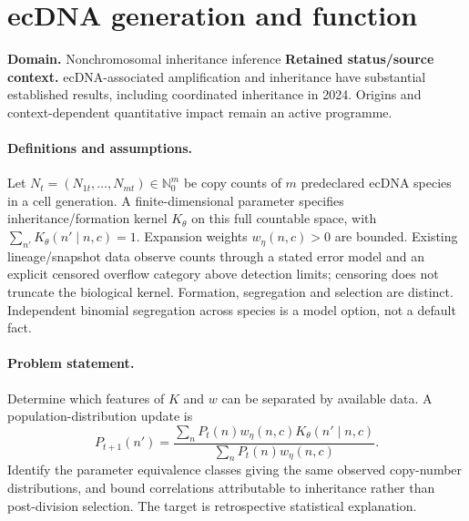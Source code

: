 \documentclass[11pt]{article}
\begin{document}
\section*{ecDNA generation and function}
\label{prob:249}
\label{rank:106}
\par\smallskip

\noindent\textbf{Domain.} Nonchromosomal inheritance inference \quad \textbf{Retained status/source context.} ecDNA-associated amplification and inheritance have substantial established results, including coordinated inheritance in 2024. Origins and context-dependent quantitative impact remain an active programme.
\paragraph{Definitions and assumptions.} Let $N_t=(N_{1t},\ldots,N_{mt})\in\mathbb{N}_0^m$ be copy counts of $m$ predeclared ecDNA species in a cell generation. A finite-dimensional parameter specifies inheritance/formation kernel $K_\theta$ on this full countable space, with $\sum_{n'}K_\theta(n'\mid n,c)=1$. Expansion weights $w_\eta(n,c)>0$ are bounded. Existing lineage/snapshot data observe counts through a stated error model and an explicit censored overflow category above detection limits; censoring does not truncate the biological kernel. Formation, segregation and selection are distinct. Independent binomial segregation across species is a model option, not a default fact.
\paragraph{Problem statement.} Determine which features of $K$ and $w$ can be separated by available data. A population-distribution update is
    \[P_{t+1}(n')=\frac{\sum_nP_t(n)w_\eta(n,c)K_\theta(n'\mid n,c)}
    {\sum_nP_t(n)w_\eta(n,c)}.\]
    Identify the parameter equivalence classes giving the same observed copy-number distributions, and bound correlations attributable to inheritance rather than post-division selection. The target is retrospective statistical explanation.
\end{document}
